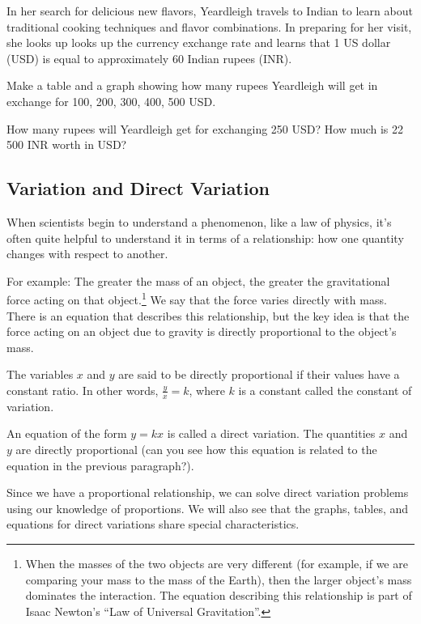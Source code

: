 \begin{boxedexplore}
In her search for delicious new flavors, Yeardleigh travels to Indian to learn about traditional cooking techniques and flavor combinations. In preparing for her visit, she looks up looks up the currency exchange rate and learns that 1 US dollar (USD) is equal to approximately 60 Indian rupees (INR).

Make a table and a graph showing how many rupees Yeardleigh will get in exchange for 100, 200, 300, 400, 500 USD.

How many rupees will Yeardleigh get for exchanging 250 USD? How much is 22\,500 INR worth in USD?
\end{boxedexplore} %

\subsection{Variation and Direct Variation}

When scientists begin to understand a phenomenon, like a law of physics, it's often quite helpful to understand it in terms of a relationship: how one quantity changes with respect to another.

For example: The greater the mass of an object, the greater the gravitational force acting on that object.\footnote{When the masses of the two objects are very different (for example, if we are comparing your mass to the mass of the Earth), then the larger object's mass dominates the interaction. The equation describing this relationship is part of Isaac Newton's ``Law of Universal Gravitation''.} We say that the force varies directly with mass. There is an equation that describes this relationship, but the key idea is that the force acting on an object due to gravity is directly proportional to the object's mass.

\begin{boxeddef}
The variables $x$ and $y$ are said to be \gls{directly proportional} if their values have a constant ratio. In other words, $\frac{y}{x} = k$, where $k$ is a constant called the \gls{constant of variation}.

An equation of the form $y = kx$ is called a \gls{direct variation}. The quantities $x$ and $y$ are directly proportional (can you see how this equation is related to the equation in the previous paragraph?).
\end{boxeddef}

Since we have a proportional relationship, we can solve direct variation problems using our knowledge of proportions. We will also see that the graphs, tables, and equations for direct variations share special characteristics.

